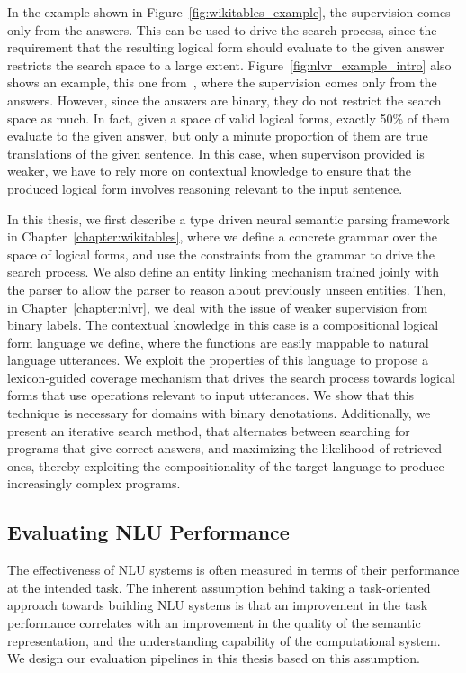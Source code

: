 In the example shown in Figure~\ref{fig:wikitables_example}, the supervision comes only from the
answers. This can be used to drive the search process, since the requirement that the resulting
logical form should evaluate to the given answer restricts the search space to a large extent.
Figure~\ref{fig:nlvr_example_intro} also shows an example, this one
from~\cite{suhr2017corpus}, where the supervision comes only from the
answers. However, since the answers are binary, they do not restrict the search space as much. In
fact, given a space of valid logical forms, exactly 50\% of them evaluate to the given answer, but
only a minute proportion of them are true translations of the given sentence. In this case, when
supervison provided is weaker, we have to rely more on contextual knowledge to ensure that the
produced logical form involves reasoning relevant to the input sentence.

In this thesis, we first describe a type driven neural semantic parsing framework in
Chapter~\ref{chapter:wikitables}, where we define a concrete grammar over the space of logical
forms, and use the constraints from the grammar to drive the search process. We also define an
entity linking mechanism trained joinly with the parser to allow the parser to reason about
previously unseen entities. Then, in Chapter~\ref{chapter:nlvr}, we deal with the issue of weaker
supervision from binary labels. The contextual knowledge in this case is a compositional logical
form language we define, where the functions are easily mappable to natural language utterances. We
exploit the properties of this language to propose a lexicon-guided coverage mechanism that drives
the search process towards logical forms that use operations relevant to input utterances.  We show
that this technique is necessary for domains with binary denotations. Additionally, we present an
iterative search method, that alternates between searching for programs that give correct answers,
and maximizing the likelihood of retrieved ones, thereby exploiting the compositionality of the
target language to produce increasingly complex programs. 

\subsection{Evaluating NLU Performance} The effectiveness of NLU systems is often measured in terms
of their performance at the intended task. The inherent assumption behind taking a task-oriented
approach towards building NLU systems is that an improvement in the task performance correlates with
an improvement in the quality of the semantic representation, and the understanding capability of
the computational system.  We design our evaluation pipelines in this thesis based on this
assumption.

